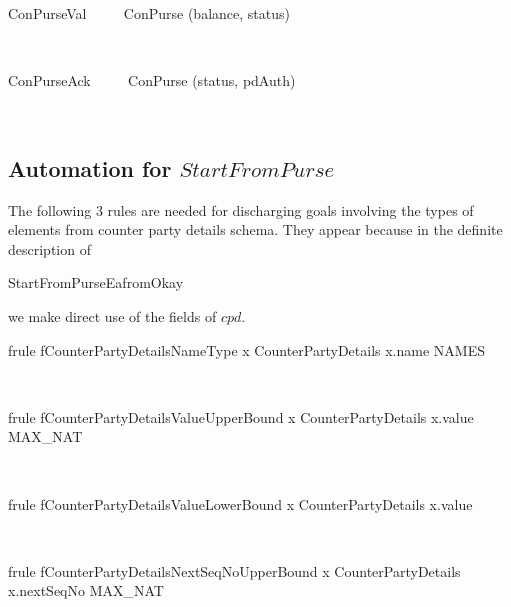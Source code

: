\begin{LSDef}
\begin{zed}
   ConPurseVal ~~~~ ConPurse \hide (balance, status)
\end{zed}~\end{LSDef}

\begin{LSDef}
\begin{zed}
   ConPurseAck ~~~~ ConPurse \hide (status, pdAuth)
\end{zed}~\end{LSDef}

\subsection*{Automation for $StartFromPurse$}

The following $3$ rules are needed for discharging goals involving the types of elements
from counter party details schema. They appear because in the definite description of
\begin{gzed} StartFromPurseEafromOkay \end{gzed} we make direct use of the fields of $cpd$.
%
\begin{LFRT}
\begin{theorem}{frule fCounterPartyDetailsNameType}
   x \in CounterPartyDetails \implies x.name \in NAMES
\end{theorem}~\end{LFRT}

\begin{LFRT}
\begin{theorem}{frule fCounterPartyDetailsValueUpperBound}
   x \in CounterPartyDetails \implies x.value \leq MAX\_NAT
\end{theorem}~\end{LFRT}

\begin{LFRT}
\begin{theorem}{frule fCounterPartyDetailsValueLowerBound}
   x \in CounterPartyDetails  \leq x.value
\end{theorem}~\end{LFRT}

\begin{LFRT}
\begin{theorem}{frule fCounterPartyDetailsNextSeqNoUpperBound}
   x \in CounterPartyDetails \implies x.nextSeqNo \leq MAX\_NAT
\end{theorem}~\end{LFRT}

